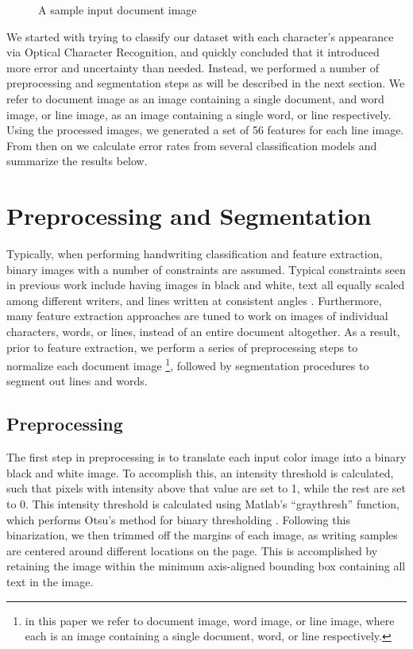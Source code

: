 \documentclass[paper=a4, fontsize=11pt]{scrartcl} %
\numberwithin{equation}{section} %
\numberwithin{figure}{section} %
\numberwithin{table}{section} %
\begin{document}
\begin{figure}
\centering {}
\caption{A sample input document image}
\label{fig:docImage}
\end{figure}

We started with trying to classify our dataset with each character’s appearance via Optical Character Recognition, and quickly concluded that it introduced more error and uncertainty than needed. Instead, we performed a number of preprocessing and segmentation steps as will be described in the next section. We refer to document image as an image containing a single document,  and word image, or line image, as an image containing a single word, or line respectively. Using the processed images, we generated a set of 56 features for each line image. From then on we calculate error rates from several classification models and summarize the results below.

\section{Preprocessing and Segmentation}
\label{sec:pands}
Typically, when performing handwriting classification and feature extraction, binary images with a number of constraints are assumed. Typical constraints seen in previous work include having images in black and white, text all equally scaled among different writers, and lines written at consistent angles \cite{Preprocessing}. Furthermore, many feature extraction approaches are tuned to work on images of individual characters, words, or lines, instead of an entire document altogether. As a result, prior to feature extraction, we perform a series of preprocessing steps to normalize each document image \footnote{in this paper we refer to
document image, word image, or line image, where each is an image
containing a single document, word, or line respectively.}, followed by segmentation procedures to segment out lines and words.

\subsection{Preprocessing}
The first step in preprocessing is to translate each input color image
into a binary black and white image. To accomplish this, an intensity
threshold is calculated, such that pixels with intensity above that
value are set to 1, while the rest are set to 0. This intensity
threshold is calculated using Matlab's ``graythresh'' function, which
performs Otsu's method for binary thresholding
\cite{ThresholdSelection}. Following this binarization, we then trimmed
off the margins of each image, as writing samples are centered around
different locations on the page. This is accomplished by retaining the
image within the minimum axis-aligned bounding box containing all text
in the image.
\end{document}
